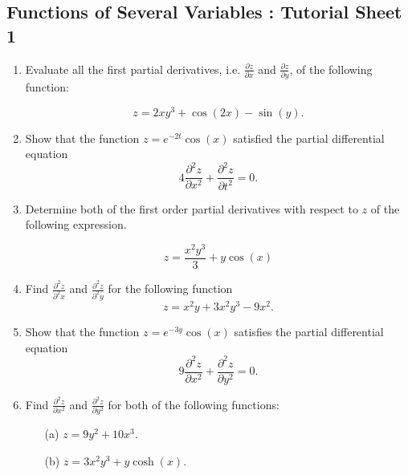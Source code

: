 \documentclass[a4paper,12pt]{article}
\begin{document}
\subsection*{Functions of Several Variables : Tutorial Sheet 1}

\begin{enumerate}
    \item  Evaluate all the first partial derivatives, i.e. $\frac{\partial z}{\partial x}$ and $\frac{\partial z}{\partial y} $, 
of the following function:

\[ z = 2xy^3 + \cos(2x) - \sin(y) .\]



 \item 
 Show that the function $z=e^{-2t}\cos(x)$ satisfied the partial differential equation
 \[ 4\frac{\partial^2 z}{\partial x^2} + \frac{\partial^2 z}{\partial t^2} = 0. \]
 
 
 
 \item Determine both of the first order partial derivatives with respect to $z$ of the following expression.

\[ z = \frac{x^2y^3}{3} +  y \cos(x)\]
 

	\item Find $\displaystyle{ \frac{ \partial^2 z }{ \partial^2 x  }}$ and $\displaystyle{ \frac{ \partial^2 z }{ \partial^2 y }}$  for the following function
\[ z = x^2y + 3x^2y^3 - 9x^2.\]	

	\item	Show that the function $z=e^{-3y}\cos(x)$ satisfies the partial differential equation
	\[ 9\frac{\partial^2 z}{\partial x^2} + \frac{\partial^2 z}{\partial y^2} = 0. \]


	
	
	\item Find $\displaystyle{ \frac{ \partial^2 z }{ \partial x^2 }}$ and $\displaystyle{ \frac{ \partial^2 z }{ \partial y^2 }}$  for both of the following functions:

	\begin{multicols}{2}
		\begin{itemize}
			\item[(a)] $\displaystyle{  z = 9y^2 +10x^3. }  $
				\item[(b)] $\displaystyle{  z = 3x^2y^3 + y\cosh(x).}$
				
			\end{itemize}
		\end{multicols}


\end{enumerate}
\end{document}

